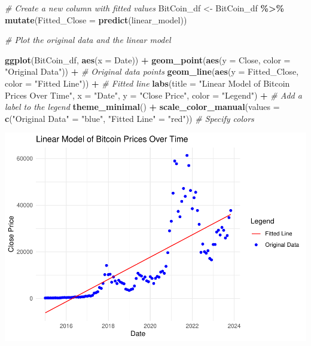 \documentclass[
]{book}
\newenvironment{Shaded}{\begin{snugshade}}{\end{snugshade}}
\newcommand{\AttributeTok}[1]{\textcolor[rgb]{0.13,0.29,0.53}{#1}}
\newcommand{\CommentTok}[1]{\textcolor[rgb]{0.56,0.35,0.01}{\textit{#1}}}
\newcommand{\FunctionTok}[1]{\textcolor[rgb]{0.13,0.29,0.53}{\textbf{#1}}}
\newcommand{\NormalTok}[1]{#1}
\newcommand{\OtherTok}[1]{\textcolor[rgb]{0.56,0.35,0.01}{#1}}
\newcommand{\SpecialCharTok}[1]{\textcolor[rgb]{0.81,0.36,0.00}{\textbf{#1}}}
\newcommand{\StringTok}[1]{\textcolor[rgb]{0.31,0.60,0.02}{#1}}
\begin{document}
\begin{Shaded}
\begin{Highlighting}[]
\CommentTok{\# Create a new column with fitted values}
\NormalTok{BitCoin\_df }\OtherTok{\textless{}{-}}\NormalTok{ BitCoin\_df }\SpecialCharTok{\%\textgreater{}\%}
\FunctionTok{mutate}\NormalTok{(}\AttributeTok{Fitted\_Close =} \FunctionTok{predict}\NormalTok{(linear\_model))}

\CommentTok{\# Plot the original data and the linear model}

\FunctionTok{ggplot}\NormalTok{(BitCoin\_df, }\FunctionTok{aes}\NormalTok{(}\AttributeTok{x =}\NormalTok{ Date)) }\SpecialCharTok{+}
\FunctionTok{geom\_point}\NormalTok{(}\FunctionTok{aes}\NormalTok{(}\AttributeTok{y =}\NormalTok{ Close, }\AttributeTok{color =} \StringTok{"Original Data"}\NormalTok{)) }\SpecialCharTok{+}  \CommentTok{\# Original data points}
\FunctionTok{geom\_line}\NormalTok{(}\FunctionTok{aes}\NormalTok{(}\AttributeTok{y =}\NormalTok{ Fitted\_Close, }\AttributeTok{color =} \StringTok{"Fitted Line"}\NormalTok{)) }\SpecialCharTok{+}  \CommentTok{\# Fitted line}
\FunctionTok{labs}\NormalTok{(}\AttributeTok{title =} \StringTok{"Linear Model of Bitcoin Prices Over Time"}\NormalTok{,}
     \AttributeTok{x =} \StringTok{"Date"}\NormalTok{,}
     \AttributeTok{y =} \StringTok{"Close Price"}\NormalTok{,}
     \AttributeTok{color =} \StringTok{"Legend"}\NormalTok{) }\SpecialCharTok{+}  \CommentTok{\# Add a label to the legend}
\FunctionTok{theme\_minimal}\NormalTok{() }\SpecialCharTok{+}
\FunctionTok{scale\_color\_manual}\NormalTok{(}\AttributeTok{values =} \FunctionTok{c}\NormalTok{(}\StringTok{"Original Data"} \OtherTok{=} \StringTok{"blue"}\NormalTok{, }\StringTok{"Fitted Line"} \OtherTok{=} \StringTok{"red"}\NormalTok{))  }\CommentTok{\# Specify colors}
\end{Highlighting}
\end{Shaded}

\includegraphics{bookdown-demo_files/figure-latex/unnamed-chunk-17-1.pdf}
\end{document}
